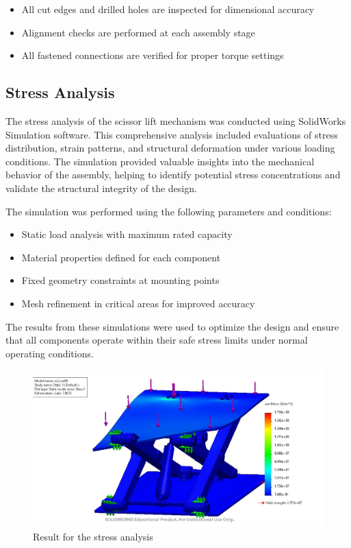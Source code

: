 \documentclass[../../main]{subfiles}
\begin{document}
\begin{itemize}
\item
  All cut edges and drilled holes are inspected for dimensional accuracy
\item
  Alignment checks are performed at each assembly stage
\item
  All fastened connections are verified for proper torque settings
\end{itemize}

\subsection{Stress Analysis}\label{stress-analysis}

The stress analysis of the scissor lift mechanism was conducted using
SolidWorks Simulation software. This comprehensive analysis included
evaluations of stress distribution, strain patterns, and structural
deformation under various loading conditions. The simulation provided
valuable insights into the mechanical behavior of the assembly, helping
to identify potential stress concentrations and validate the structural
integrity of the design.

The simulation was performed using the following parameters and
conditions:

\begin{itemize}
\item
  Static load analysis with maximum rated capacity
\item
  Material properties defined for each component
\item
  Fixed geometry constraints at mounting points
\item
  Mesh refinement in critical areas for improved accuracy
\end{itemize}

The results from these simulations were used to optimize the design and
ensure that all components operate within their safe stress limits under
normal operating conditions.

\begin{figure}[h!]
\centering
\includegraphics[width=\textwidth]{img/image103.jpg}
\caption{Result for the stress analysis}
\end{figure}
\end{document}
